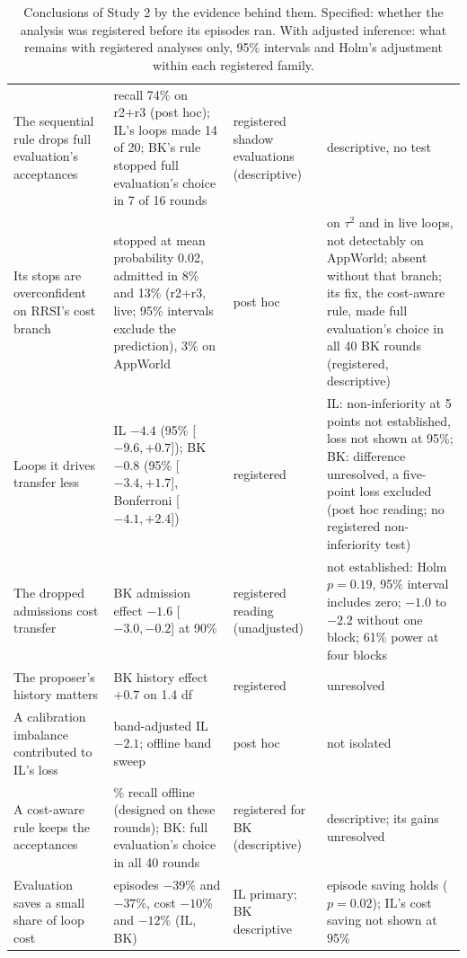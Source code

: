 \documentclass[11pt]{article}
\begin{document}
\begin{table}[p]
\begin{tabular}{@{}>{\raggedright\arraybackslash}p{4.0cm}>{\raggedright\arraybackslash}p{5.1cm}>{\raggedright\arraybackslash}p{2.6cm}>{\raggedright\arraybackslash}p{3.6cm}@{}}
The sequential rule drops full evaluation's acceptances & recall 74\% on r2+r3 (post hoc); IL's loops made 14 of 20; BK's rule stopped full evaluation's choice in 7 of 16 rounds & registered shadow evaluations (descriptive) & descriptive, no test \\
Its stops are overconfident on RRSI's cost branch & stopped at mean probability 0.02, admitted in 8\% and 13\% (r2+r3, live; 95\% intervals exclude the prediction), 3\% on AppWorld & post hoc & on $\tau^2$ and in live loops, not detectably on AppWorld; absent without that branch; its fix, the cost-aware rule, made full evaluation's choice in all 40 BK rounds (registered, descriptive) \\
Loops it drives transfer less & IL $-4.4$ (95\% [$-9.6,+0.7$]); BK $-0.8$ (95\% [$-3.4,+1.7$], Bonferroni [$-4.1,+2.4$]) & registered & IL: non-inferiority at 5 points not established, loss not shown at 95\%; BK: difference unresolved, a five-point loss excluded (post hoc reading; no registered non-inferiority test) \\
The dropped admissions cost transfer & BK admission effect $-1.6$ [$-3.0,-0.2$] at 90\% & registered reading (unadjusted) & not established: Holm $p=0.19$, 95\% interval includes zero; $-1.0$ to $-2.2$ without one block; 61\% power at four blocks \\
The proposer's history matters & BK history effect $+0.7$ on 1.4 df & registered & unresolved \\
A calibration imbalance contributed to IL's loss & band-adjusted IL $-2.1$; offline band sweep & post hoc & not isolated \\
A cost-aware rule keeps the acceptances & 88\% recall offline (designed on these rounds); BK: full evaluation's choice in all 40 rounds & registered for BK (descriptive) & descriptive; its gains unresolved \\
Evaluation saves a small share of loop cost & episodes $-39$\% and $-37$\%, cost $-10$\% and $-12$\% (IL, BK) & IL primary; BK descriptive & episode saving holds ($p=0.02$); IL's cost saving not shown at 95\% \\
\bottomrule
\end{tabular}
\caption{Conclusions of Study 2 by the evidence behind them. Specified: whether the analysis was registered before its episodes ran. With adjusted inference: what remains with registered analyses only, 95\% intervals and Holm's adjustment within each registered family.}
\label{tab:claims}
\end{table}
\end{document}
